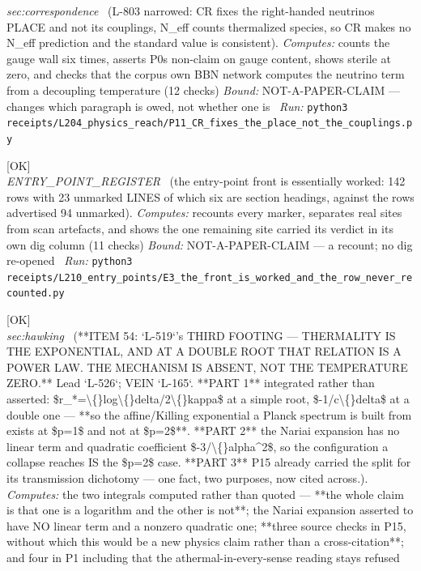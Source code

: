 \begin{description}
\textit{sec:correspondence} \ (L-803 narrowed: CR fixes the right-handed neutrinos PLACE and not its couplings, N\_eff counts thermalized species, so CR makes no N\_eff prediction and the standard value is consistent). 
\emph{Computes:} counts the gauge wall six times, asserts P0s non-claim on gauge content, shows sterile at zero, and checks that the corpus own BBN network computes the neutrino term from a decoupling temperature (12 checks)
 \emph{Bound:} NOT-A-PAPER-CLAIM --- changes which paragraph is owed, not whether one is
\ \emph{Run:} \texttt{python3 receipts/L204\_physics\_reach/P11\_CR\_fixes\_the\_place\_not\_the\_couplings.py}
\item[\label{rcpt:E3_the_front_is_worked_and_the_row_never_recounted}\texttt{E3\_the\_front\_is\_worked\_and\_the\_row\_never\_recounted}]\hfill\textsf{[OK]}\\
\textit{ENTRY\_POINT\_REGISTER} \ (the entry-point front is essentially worked: 142 rows with 23 unmarked LINES of which six are section headings, against the rows advertised 94 unmarked). 
\emph{Computes:} recounts every marker, separates real sites from scan artefacts, and shows the one remaining site carried its verdict in its own dig column (11 checks)
 \emph{Bound:} NOT-A-PAPER-CLAIM --- a recount; no dig re-opened
\ \emph{Run:} \texttt{python3 receipts/L210\_entry\_points/E3\_the\_front\_is\_worked\_and\_the\_row\_never\_recounted.py}
\item[\label{rcpt:P1_thermality_is_the_exponential_and_a_double_root_has_no_exponential}\texttt{P1\_thermality\_is\_the\_exponential\_and\_a\_double\_root\_has\_no\_exponential}]\hfill\textsf{[OK]}\\
\textit{sec:hawking} \ (**ITEM 54: `L-519`'s THIRD FOOTING --- THERMALITY IS THE EXPONENTIAL, AND AT A DOUBLE ROOT THAT RELATION IS A POWER LAW. THE MECHANISM IS ABSENT, NOT THE TEMPERATURE ZERO.** Lead `L-526`; VEIN `L-165`. **PART 1** integrated rather than asserted: \$r\_*=\textbackslash\{\}log\textbackslash\{\}delta/2\textbackslash\{\}kappa\$ at a simple root, \$-1/c\textbackslash\{\}delta\$ at a double one --- **so the affine/Killing exponential a Planck spectrum is built from exists at \$p=1\$ and not at \$p=2\$**. **PART 2** the Nariai expansion has no linear term and quadratic coefficient \$-3/\textbackslash\{\}alpha\textasciicircum{}2\$, so the configuration a collapse reaches IS the \$p=2\$ case. **PART 3** P15 already carried the split for its transmission dichotomy --- one fact, two purposes, now cited across.). 
\emph{Computes:} the two integrals computed rather than quoted --- **the whole claim is that one is a logarithm and the other is not**; the Nariai expansion asserted to have NO linear term and a nonzero quadratic one; **three source checks in P15, without which this would be a new physics claim rather than a cross-citation**; and four in P1 including that the athermal-in-every-sense reading stays refused

\end{description}
